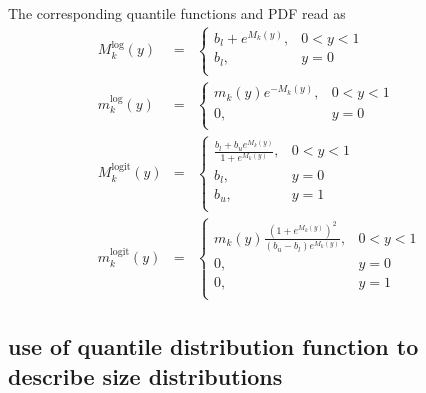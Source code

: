 The corresponding quantile functions and PDF read as
\begin{eqnarray}
   M_k^{\log}(y) &=&  \left\{{\begin{array}{ll}
    b_l+e^{M_k(y)}, & 0<y<1 \\
    b_l, & y=0\\
    \end{array}}\right. \label{eq:MkLog}\\
   m_k^{\log}(y) &=&  \left\{{\begin{array}{ll}
    m_k(y)e^{-M_k(y)}, & 0<y<1 \\
    0, & y=0\\
    \end{array}}\right. \label{eq:mkLog}\\
   M_k^{\mathrm{logit}}(y) &=&  \left\{{\begin{array}{ll}
    \frac{b_l+b_ue^{M_k(y)}}{1+e^{M_k(y)}}, & 0<y<1 \\
    b_l, & y=0\\
    b_u, & y=1\\
    \end{array}}\right. \label{eq:MkLogit}\\
   m_k^{\mathrm{logit}}(y) &=&  \left\{{\begin{array}{ll}
    m_k(y)\frac{\left(1+e^{M_k(y)}\right)^2}{(b_u-b_l)e^{M_k(y)}}, & 0<y<1 \\
    0, & y=0\\
    0, & y=1\\
    \end{array}}\right. \label{eq:mkLogit}
 \end{eqnarray}

\subsection{use of quantile distribution function to describe size distributions} ~\\

